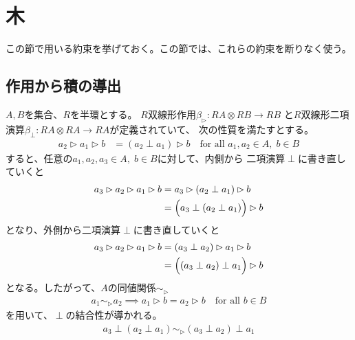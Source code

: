 \section{木} %
	この節で用いる約束を挙げておく。この節では、これらの約束を断りなく使う。
	

	\subsection{作用から積の導出}\label{s2:作用から積の導出} %
		$A,B$を集合、$R$を半環とする。
		$R$双線形作用$\beta_\rhd:RA\otimes RB\to RB$
		と$R$双線形二項演算$\beta_\perp:RA\otimes RA\to RA$が定義されていて、
		次の性質を満たすとする。
		\begin{equation}\label{eq:結合的な作用}\begin{split} %
			a_2\rhd a_1\rhd b &= (a_2\perp a_1)\rhd b
			\quad\text{for all }a_1,a_2\in A,\;b\in B
		\end{split}\end{equation} %
		すると、任意の$a_1,a_2,a_3\in A,\;b\in B$に対して、内側から
		二項演算$\perp$に書き直していくと
		\begin{equation*}\begin{split} %
			a_3\rhd a_2\rhd a_1\rhd b &= a_3\rhd(a_2\perp a_1)\rhd b \\
			&= \Bigl(a_3\perp(a_2\perp a_1)\Bigr)\rhd b
		\end{split}\end{equation*} %
		となり、外側から二項演算$\perp$に書き直していくと
		\begin{equation*}\begin{split} %
			a_3\rhd a_2\rhd a_1\rhd b &= (a_3\perp a_2)\rhd a_1\rhd b \\
			&= \Bigl((a_3\perp a_2)\perp a_1\Bigr)\rhd b
		\end{split}\end{equation*} %
		となる。したがって、$A$の同値関係$\sim_\rhd$
		\begin{equation}\begin{split} %
			a_1 \sim_\rhd a_2 \implies
			a_1\rhd b = a_2\rhd b \quad\text{for all }b\in B
		\end{split}\end{equation} %
		を用いて、$\perp$の結合性が導かれる。
		\begin{equation*}\begin{split} %
			a_3\perp(a_2\perp a_1) \sim_\rhd (a_3\perp a_2)\perp a_1
		\end{split}\end{equation*} %

